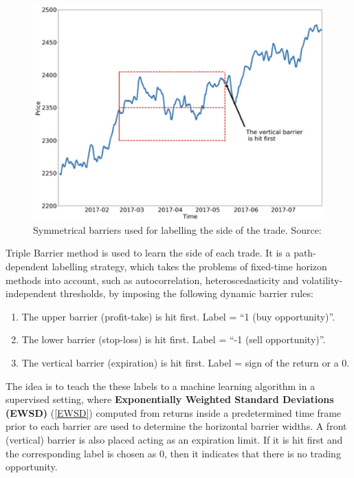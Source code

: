 \documentclass{article}
\begin{document}
\begin{figure}[!htbp]
     \centering
     \includegraphics[scale=0.28]{3bar.png}
     \caption{Symmetrical barriers used for labelling the side of the trade. Source: \cite{advances_in_ml}}
\end{figure}

Triple Barrier method is used to learn the side of each trade. It is a path-dependent labelling strategy, which takes the problems of fixed-time horizon methods into account, such as autocorrelation, heteroscedasticity and volatility-independent thresholds, by imposing the following dynamic barrier rules:

\begin{enumerate}
    \item The upper barrier (profit-take) is hit first. Label = “1 (buy opportunity)”.
    
    \item The lower barrier (stop-loss) is hit first. Label = “-1 (sell opportunity)”.
    
    \item The vertical barrier (expiration) is hit first. Label = sign of the return or a 0.
\end{enumerate}

The idea is to teach the these labels to a machine learning algorithm in a supervised setting, where \textbf{Exponentially Weighted Standard Deviations (EWSD)} (\ref{EWSD}) computed from returns inside a predetermined time frame prior to each barrier are used to determine the horizontal barrier widths. A front (vertical) barrier is also placed acting as an expiration limit. If it is hit first and the corresponding label is chosen as 0, then it indicates that there is no trading opportunity.
\end{document}
